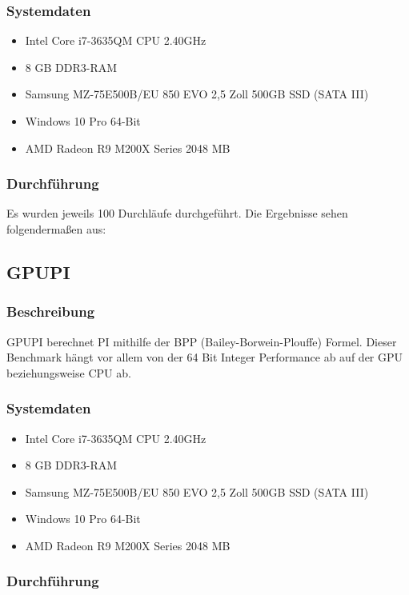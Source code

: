 \subsubsection{Systemdaten}
\begin{itemize}
\item Intel Core i7-3635QM CPU 2.40GHz
\item 8 GB DDR3-RAM
\item Samsung MZ-75E500B/EU 850 EVO 2,5 Zoll 500GB SSD (SATA III)
\item Windows 10 Pro 64-Bit
\item AMD Radeon R9 M200X Series 2048 MB
\end{itemize}
\subsubsection{Durchführung}
Es wurden jeweils 100 Durchläufe durchgeführt.
Die Ergebnisse sehen folgendermaßen aus:

\subsection{GPUPI}
\subsubsection{Beschreibung}
GPUPI berechnet PI mithilfe der BPP (Bailey-Borwein-Plouffe) Formel. Dieser Benchmark hängt vor allem von der 64 Bit Integer Performance ab auf der GPU beziehungsweise CPU ab.
\subsubsection{Systemdaten}
\begin{itemize}
\item Intel Core i7-3635QM CPU 2.40GHz
\item 8 GB DDR3-RAM
\item Samsung MZ-75E500B/EU 850 EVO 2,5 Zoll 500GB SSD (SATA III)
\item Windows 10 Pro 64-Bit
\item AMD Radeon R9 M200X Series 2048 MB
\end{itemize}
\subsubsection{Durchführung}

